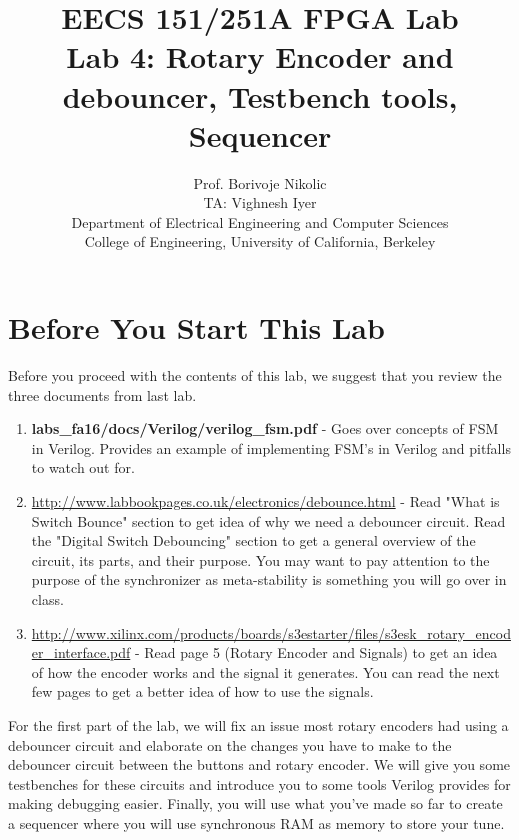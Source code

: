 \documentclass[11pt]{article}
\begin{document}
\title{EECS 151/251A FPGA Lab\\
Lab 4: Rotary Encoder and debouncer, Testbench tools, Sequencer}

\author{Prof. Borivoje Nikolic \\
TA: Vighnesh Iyer \\Department of Electrical Engineering and Computer Sciences\\
College of Engineering, University of California, Berkeley}
\date{}
\maketitle

\section{Before You Start This Lab}

Before you proceed with the contents of this lab, we suggest that you review the three documents from last lab.

\begin{enumerate}
	\item \textbf{labs\_fa16/docs/Verilog/verilog\_fsm.pdf} - Goes over concepts of FSM in Verilog. Provides an example of  implementing FSM's in Verilog and pitfalls to watch out for.
	
	\item \url{http://www.labbookpages.co.uk/electronics/debounce.html} - Read "What is Switch Bounce" section to get idea of why we need a debouncer circuit. Read the "Digital Switch Debouncing" section to get a general overview of the circuit, its parts, and their purpose. You may want to pay attention to the purpose of the synchronizer as meta-stability is something you will go over in class. 
	
	\item \url{http://www.xilinx.com/products/boards/s3estarter/files/s3esk_rotary_encoder_interface.pdf} - Read page 5 (Rotary Encoder and Signals) to get an idea of how the encoder works and the signal it generates. You can read the next few pages to get a better idea of how to use the signals. 

\end{enumerate}

For the first part of the lab, we will fix an issue most rotary encoders had using a debouncer circuit and elaborate on the changes you have to make to the debouncer circuit between the buttons and rotary encoder. We will give you some testbenches for these circuits and introduce you to some tools Verilog provides for making debugging easier. Finally, you will use what you've made so far to create a sequencer where you will use synchronous RAM as memory to store your tune.
\end{document}
